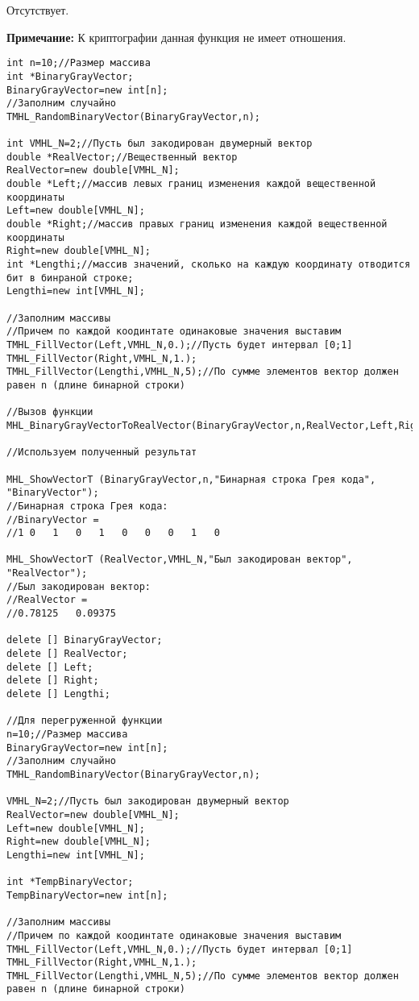 \documentclass[a4paper,12pt]{article}
\begin{document}
Отсутствует.

\textbf{Примечание:}
 К криптографии данная функция не имеет отношения.



\begin{lstlisting}[label=code_use_MHL_BinaryGrayVectorToRealVector,caption=Пример использования]
int n=10;//Размер массива
int *BinaryGrayVector;
BinaryGrayVector=new int[n];
//Заполним случайно
TMHL_RandomBinaryVector(BinaryGrayVector,n);

int VMHL_N=2;//Пусть был закодирован двумерный вектор
double *RealVector;//Вещественный вектор
RealVector=new double[VMHL_N];
double *Left;//массив левых границ изменения каждой вещественной координаты
Left=new double[VMHL_N];
double *Right;//массив правых границ изменения каждой вещественной координаты
Right=new double[VMHL_N];
int *Lengthi;//массив значений, сколько на каждую координату отводится бит в бинраной строке;
Lengthi=new int[VMHL_N];

//Заполним массивы
//Причем по каждой коодинтате одинаковые значения выставим
TMHL_FillVector(Left,VMHL_N,0.);//Пусть будет интервал [0;1]
TMHL_FillVector(Right,VMHL_N,1.);
TMHL_FillVector(Lengthi,VMHL_N,5);//По сумме элементов вектор должен равен n (длине бинарной строки)

//Вызов функции
MHL_BinaryGrayVectorToRealVector(BinaryGrayVector,n,RealVector,Left,Right,Lengthi,VMHL_N);

//Используем полученный результат

MHL_ShowVectorT (BinaryGrayVector,n,"Бинарная строка Грея кода", "BinaryVector");
//Бинарная строка Грея кода:
//BinaryVector =
//1	0	1	0	1	0	0	0	1	0

MHL_ShowVectorT (RealVector,VMHL_N,"Был закодирован вектор", "RealVector");
//Был закодирован вектор:
//RealVector =
//0.78125	0.09375

delete [] BinaryGrayVector;
delete [] RealVector;
delete [] Left;
delete [] Right;
delete [] Lengthi;

//Для перегруженной функции
n=10;//Размер массива
BinaryGrayVector=new int[n];
//Заполним случайно
TMHL_RandomBinaryVector(BinaryGrayVector,n);

VMHL_N=2;//Пусть был закодирован двумерный вектор
RealVector=new double[VMHL_N];
Left=new double[VMHL_N];
Right=new double[VMHL_N];
Lengthi=new int[VMHL_N];

int *TempBinaryVector;
TempBinaryVector=new int[n];

//Заполним массивы
//Причем по каждой коодинтате одинаковые значения выставим
TMHL_FillVector(Left,VMHL_N,0.);//Пусть будет интервал [0;1]
TMHL_FillVector(Right,VMHL_N,1.);
TMHL_FillVector(Lengthi,VMHL_N,5);//По сумме элементов вектор должен равен n (длине бинарной строки)


\end{lstlisting}
\end{document}
